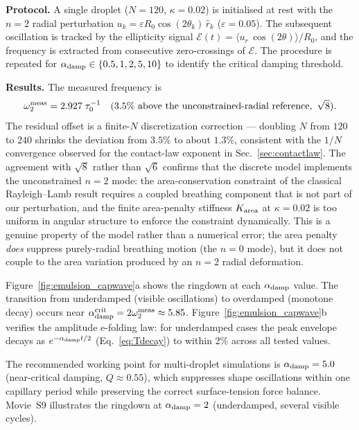 \documentclass[aps,pre,twocolumn,floatfix,longbibliography]{revtex4-2}
\begin{document}
\textbf{Protocol.}  A single droplet ($N = 120$, $\kappa = 0.02$) is initialised
at rest with the $n = 2$ radial perturbation
$u_k = \varepsilon R_0 \cos(2\theta_k)\,\hat{r}_k$ ($\varepsilon = 0.05$).  The
subsequent oscillation is tracked by the ellipticity signal
$\mathcal{E}(t) = \langle u_r\,\cos(2\theta)\rangle/R_0$, and the frequency is
extracted from consecutive zero-crossings of $\mathcal{E}$.  The procedure is
repeated for $\alpha_{\rm damp} \in \{0.5, 1, 2, 5, 10\}$ to identify the critical
damping threshold.

\textbf{Results.}  The measured frequency is
\begin{equation}
  \omega_2^{\rm meas} = 2.927\;\tau_0^{-1} \quad
  (3.5\%\ \text{above the unconstrained-radial reference},\ \sqrt{8}).
\end{equation}
The residual offset is a finite-$N$ discretization correction --- doubling
$N$ from $120$ to $240$ shrinks the deviation from $3.5\%$ to about $1.3\%$,
consistent with the $1/N$ convergence observed for the contact-law exponent in
Sec.~\ref{sec:contactlaw}.  The agreement with $\sqrt{8}$ rather than $\sqrt{6}$
confirms that the discrete model implements the unconstrained $n=2$ mode: the
area-conservation constraint of the classical Rayleigh--Lamb result requires
a coupled breathing component that is not part of our perturbation, and the
finite area-penalty stiffness $K_{\rm area}$ at $\kappa = 0.02$ is too uniform
in angular structure to enforce the constraint dynamically.  This is a genuine
property of the model rather than a numerical error; the area penalty
\emph{does} suppress purely-radial breathing motion (the $n=0$ mode), but it
does not couple to the area variation produced by an $n=2$ radial deformation.

Figure~\ref{fig:emulsion_capwave}a shows the ringdown at each $\alpha_{\rm damp}$
value.  The transition from underdamped (visible oscillations) to overdamped
(monotone decay) occurs near $\alpha_{\rm damp}^{\rm crit} = 2\omega_2^{\rm meas}
\approx 5.85$.  Figure~\ref{fig:emulsion_capwave}b verifies the amplitude
e-folding law: for underdamped cases the peak envelope decays as $e^{-\alpha_{\rm damp}t/2}$
(Eq.~\ref{eq:Tdecay}) to within 2\% across all tested values.

The recommended working point for multi-droplet simulations is
$\alpha_{\rm damp} = 5.0$ (near-critical damping, $Q \approx 0.55$), which suppresses
shape oscillations within one capillary period while preserving the correct
surface-tension force balance.  Movie~S9 illustrates the ringdown at $\alpha_{\rm damp} = 2$
(underdamped, several visible cycles).
\end{document}
